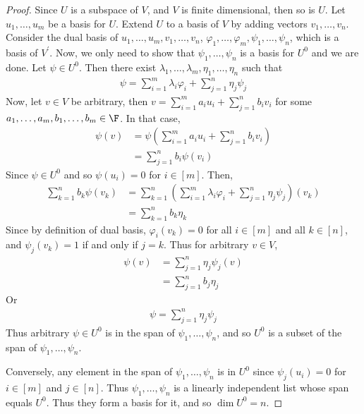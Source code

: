\documentclass{article}
\begin{document}
  \begin{proof} 
    Since $U$ is a subspace of $V$, and $V$ is finite dimensional, then so is $U$. Let $u_1, \dots, u_m$ be a basis for $U$. Extend $U$ to a basis of $V$ by adding vectors $v_1, \dots, v_n$.
    Consider the dual basis of $u_1, \dots, u_m, v_1, \dots, v_n$, $\varphi_1, \dots, \varphi_m, \psi_1, \dots, \psi_n$, which is a basis of $V^\prime$. Now, we only need to show that
    $\psi_1, \dots, \psi_n$ is a basis for $U^0$ and we are done. Let $\psi \in U^0$. Then there exist $\lambda_1, \dots, \lambda_m, \eta_1, \dots, \eta_n$ such that
    \begin{align*}
      \psi = \sum_{i = 1}^{m}\lambda_i\varphi_i + \sum_{j = 1}^{n}\eta_j\psi_j
    \end{align*}
    Now, let $v \in V$ be arbitrary, then $v = \sum_{i = 1}^{m}a_iu_i + \sum_{j = 1}^{n}b_iv_i$ for some $a_1, \dots, a_m, b_1, \dots, b_m \in \F$. In that case,
    \begin{align*}
      \psi(v) & = \psi(\sum_{i = 1}^{m}a_iu_i + \sum_{j = 1}^{n}b_iv_i) \\
      & = \sum_{j = 1}^{n}b_i\psi(v_i)
    \end{align*}
    Since $\psi \in U^0$ and so $\psi(u_i) = 0$ for $i \in [m]$. Then,
    \begin{align*}
      \sum_{k = 1}^{n}b_k\psi(v_k) & = \sum_{k = 1}^{n}(\sum_{i = 1}^{m}\lambda_i\varphi_i + \sum_{j = 1}^{n}\eta_j\psi_j)(v_k) \\
      & = \sum_{k = 1}^{n}b_k\eta_k
    \end{align*}
    Since by definition of dual basis, $\varphi_i(v_k) = 0$ for all $i \in [m]$ and all $k \in [n]$, and $\psi_j(v_k) = 1$ if and only if $j = k$. Thus for arbitrary $v \in V$,
    \begin{align*}
      \psi(v) & = \sum_{j = 1}^{n}\eta_j\psi_j(v) \\
      & = \sum_{j = 1}^{n}b_j\eta_j
    \end{align*}
    Or
    \begin{align*}
      \psi = \sum_{j = 1}^{n}\eta_j\psi_j
    \end{align*}
    Thus arbitrary $\psi \in U^0$ is in the span of $\psi_1, \dots, \psi_n$, and so $U^0$ is a subset of the span of $\psi_1, \dots, \psi_n$. 

    Conversely, any element in the span of $\psi_1, \dots, \psi_n$ is in $U^0$ since $\psi_j(u_i) = 0$ for $i \in [m]$ and $j \in [n]$. Thus $\psi_1, \dots, \psi_n$ is a linearly independent
    list whose span equals $U^0$. Thus they form a basis for it, and so $\dim U^0 = n$.

  \end{proof}
\end{document}
